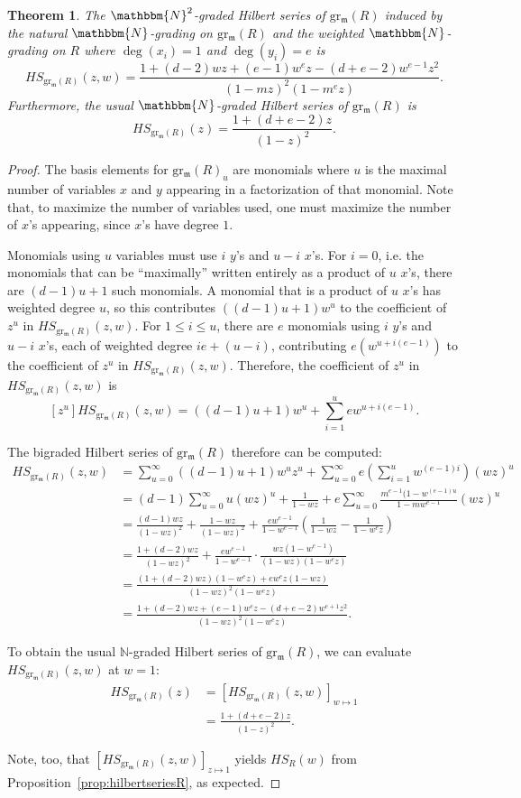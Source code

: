 \documentclass[12pt,reqno]{amsart}
\newtheorem{theorem}{Theorem}[section]
\theoremstyle{definition}
\theoremstyle{remark}
\newcommand{\grm}{\operatorname{gr_\frakm}}
\newcommand{\grmR}{{\grm(R)}}
\newcommand{\bbN}{\mathbbm{N}}
\newcommand{\frakm}{{\mathfrak{m}}}
\begin{document}
\begin{theorem}
The $\bbN^2$-graded Hilbert series of $\grmR$ induced by the natural $\bbN$-grading on $\grmR$ and the weighted $\bbN$-grading on $R$ where $\deg(x_i)=1$ and $\deg(y_i)=e$ is 
\[
HS_\grmR(z,w) = \frac{1+(d-2)wz + (e-1)w^ez - (d+e-2)w^{e-1}z^2}{(1-mz)^2(1-m^ez)}.
\]
Furthermore, the usual $\bbN$-graded Hilbert series of $\grmR$ is
\[
HS_\grmR(z) = \frac{1+(d+e-2)z}{(1-z)^2}. 
\]
\end{theorem}
\begin{proof}
The basis elements for $\grmR_u$ are monomials where $u$ is the maximal number of variables $x$ and $y$ appearing in a factorization of that monomial. Note that, to maximize the number of variables used, one must maximize the number of $x$'s appearing, since $x$'s have degree $1$. 

Monomials using $u$ variables must use $i$ $y$'s and $u-i$ $x$'s. For $i=0$, i.e. the monomials that can be ``maximally'' written entirely as a product of $u$ $x$'s, there are $(d-1)u+1$ such monomials. A monomial that is a product of $u$ $x$'s has weighted degree $u$, so this contributes $((d-1)u+1)w^u$ to the coefficient of $z^u$ in $HS_\grmR(z,w)$. For $1 \leq i \leq u$, there are $e$ monomials using $i$ $y$'s and $u-i$ $x$'s, each of weighted degree $ie+(u-i)$, contributing $e(w^{u+i(e-1)})$ to the coefficient of $z^u$ in $HS_\grmR(z,w)$.
Therefore, the coefficient of $z^u$ in $HS_\grmR(z,w)$ is 
\[
[z^u] HS_\grmR(z,w) = ((d-1)u+1)w^u + \sum\limits_{i=1}^u e w^{u+i(e-1)}.
\]

The bigraded Hilbert series of $\grmR$ therefore can be computed: 
\[
\begin{aligned}
HS_\grmR(z,w) &= \sum\limits_{u=0}^\infty ((d-1)u+1)w^uz^u + \sum\limits_{u=0}^\infty e \left( \sum\limits_{i=1}^u w^{(e-1)i}\right)(wz)^u \\
&= (d-1)\sum\limits_{u=0}^\infty u(wz)^u + \frac{1}{1-wz} + e \sum\limits_{u=0}^\infty \frac{m^{e-1}(1-w^{(e-1)u}}{1-mw^{e-1}} (wz)^u \\ 
&= \frac{(d-1)wz}{(1-wz)^2} + \frac{1-wz}{(1-wz)^2} + \frac{ew^{e-1}}{1-w^{e-1}} \left(\frac{1}{1-wz} - \frac{1}{1-w^ez}\right) \\ 
&= \frac{1+(d-2)wz}{(1-wz)^2} + \frac{ew^{e-1}}{1-w^{e-1}} \cdot \frac{wz(1-w^{e-1})}{(1-wz)(1-w^ez)} \\ 
&= \frac{(1+(d-2)wz)(1-w^ez)+ew^{e}z(1-wz)}{(1-wz)^2(1-w^ez)}\\
&=\frac{1+(d-2)wz+(e-1)w^ez-(d+e-2)w^{e+1}z^2}{(1-wz)^2(1-w^ez)}.
\end{aligned}
\]

To obtain the usual $\mathbb N$-graded Hilbert series of $\grmR$, we can evaluate $HS_\grmR(z,w)$ at $w=1$:
\[
\begin{aligned}
HS_\grmR(z) &= \left[HS_\grmR(z,w)\right]_{w \mapsto 1}\\
&= \frac{1+(d+e-2)z}{(1-z)^2}.
\end{aligned}
\]

Note, too, that $[HS_\grmR(z,w)]_{z \mapsto 1}$ yields $HS_R(w)$ from Proposition~\ref{prop:hilbertseriesR}, as expected.
\end{proof}
\end{document}
